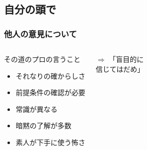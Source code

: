 \documentclass[12pt, dvipdfmx]{beamer}
\begin{document}
\subsection{自分の頭で}
\begin{frame}
    \frametitle{他人の意見について}
        \begin{columns}[c, onlytextwidth]
            \large
            \begin{block}{その道のプロの言うこと}
                \begin{itemize}
                    \large
                    \item それなりの確からしさ
                    \item 前提条件の確認が必要
                    \item 常識が異なる
                    \item 暗黙の了解が多数
                    \item 素人が下手に使う怖さ
                \end{itemize}
            \end{block}
            \LARGE
            $\Rightarrow$
            \Large
                \alert{「盲目的に\\信じてはだめ」}
        \end{columns}
        
        
\end{frame}
\end{document}
